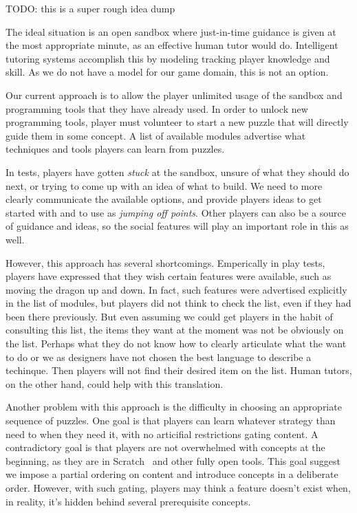 \documentclass{sig-alternate}
\newcommand{\TODO}[1]{{\color{red} TODO: #1}}
\begin{document}
\TODO{this is a super rough idea dump}

The ideal situation is an open sandbox where just-in-time guidance is given at the most appropriate minute, as an effective human tutor would do.
Intelligent tutoring systems accomplish this by modeling tracking player knowledge and skill.
As we do not have a model for our game domain, this is not an option.

Our current approach is to allow the player unlimited usage of the sandbox and programming tools that they have already used.
In order to unlock new programming tools, player must volunteer to start a new puzzle that will directly guide them in some concept.
A list of available modules advertise what techniques and tools players can learn from puzzles.

In tests, players have gotten \emph{stuck} at the sandbox, unsure of what they should do next, or trying to come up with an idea of what to build. 
We need to more clearly communicate the available options, and provide players ideas to get started with and to use as \emph{jumping off points}.
Other players can also be a source of guidance and ideas, so the social features will play an important role in this as well.

However, this approach has several shortcomings.
Emperically in play tests, players have expressed that they wish certain features were available, such as moving the dragon up and down.
In fact, such features were advertised explicitly in the list of modules, but players did not think to check the list, even if they had been there previously.
But even assuming we could get players in the habit of consulting this list, the items they want at the moment was not be obviously on the list.
Perhaps what they do not know how to clearly articulate what the want to do or we as designers have not chosen the best language to describe a techinque.
Then players will not find their desired item on the list.
Human tutors, on the other hand, could help with this translation.

Another problem with this approach is the difficulty in choosing an appropriate sequence of puzzles.
One goal is that players can learn whatever strategy than need to when they need it, with no articifial restrictions gating content.
A contradictory goal is that players are not overwhelmed with concepts at the beginning, as they are in Scratch~\cite{resnick2009scratch} and other fully open tools.
This goal suggest we impose a partial ordering on content and introduce concepts in a deliberate order.
However, with such gating, players may think a feature doesn't exist when, in reality, it's hidden behind several prerequisite concepts.
\end{document}
